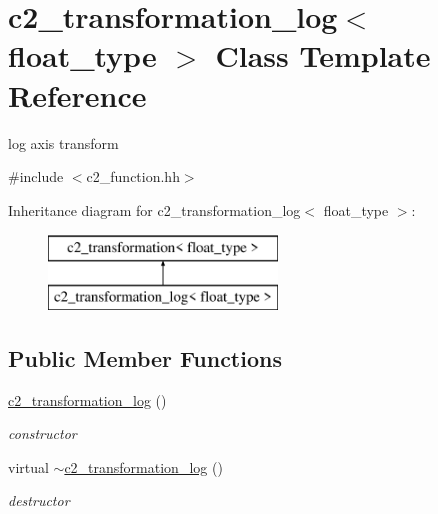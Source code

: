 \hypertarget{classc2__transformation__log}{\section{c2\-\_\-transformation\-\_\-log$<$ float\-\_\-type $>$ Class Template Reference}
\label{classc2__transformation__log}
}


log axis transform  




{\ttfamily \#include $<$c2\-\_\-function.\-hh$>$}

Inheritance diagram for c2\-\_\-transformation\-\_\-log$<$ float\-\_\-type $>$\-:\begin{figure}[H]
\begin{center}
\leavevmode
\includegraphics[height=2.000000cm]{classc2__transformation__log}
\end{center}
\end{figure}
\subsection*{Public Member Functions}
\begin{DoxyCompactItemize}
\item 
\hypertarget{classc2__transformation__log_a80bcfa2e6f34214a74d2d910ffcb67c6}{\hyperlink{classc2__transformation__log_a80bcfa2e6f34214a74d2d910ffcb67c6}{c2\-\_\-transformation\-\_\-log} ()}\label{classc2__transformation__log_a80bcfa2e6f34214a74d2d910ffcb67c6}

\begin{DoxyCompactList}\small\item\em constructor \end{DoxyCompactList}\item 
\hypertarget{classc2__transformation__log_adbd45864343f53409af79c41c8a03c5a}{virtual \hyperlink{classc2__transformation__log_adbd45864343f53409af79c41c8a03c5a}{$\sim$c2\-\_\-transformation\-\_\-log} ()}\label{classc2__transformation__log_adbd45864343f53409af79c41c8a03c5a}

\begin{DoxyCompactList}\small\item\em destructor \end{DoxyCompactList}\end{DoxyCompactItemize}
